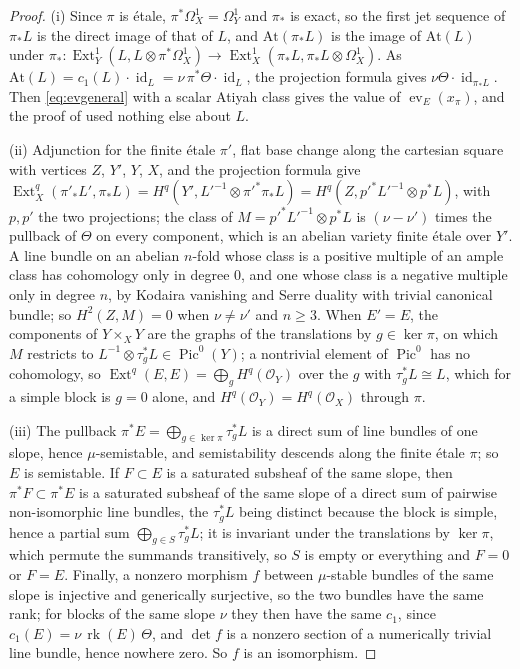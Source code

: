 \documentclass[11pt,reqno]{amsart}
\theoremstyle{plain}
\theoremstyle{definition}
\theoremstyle{remark}
\newcommand{\cO}{\mathcal{O}}
\DeclareMathOperator{\rk}{rk}
\DeclareMathOperator{\Ext}{Ext}
\DeclareMathOperator{\Pic}{Pic}
\DeclareMathOperator{\id}{id}
\begin{document}
\begin{proof}
(i) Since $\pi$ is \'etale, $\pi^{*}\Omega^{1}_{X}=\Omega^{1}_{Y}$ and $\pi_{*}$
is exact, so the first jet sequence of $\pi_{*}L$ is the direct image of
that of $L$, and $\mathrm{At}(\pi_{*}L)$ is the image of $\mathrm{At}(L)$
under $\pi_{*}\colon\Ext^{1}_{Y}(L,L\otimes\pi^{*}\Omega^{1}_{X})\to
\Ext^{1}_{X}(\pi_{*}L,\pi_{*}L\otimes\Omega^{1}_{X})$. As $\mathrm{At}(L)=c_{1}(L)\cdot\id_{L}
=\nu\,\pi^{*}\Theta\cdot\id_{L}$, the projection formula gives
$\nu\Theta\cdot\id_{\pi_{*}L}$. Then \eqref{eq:evgeneral} with a scalar Atiyah
class gives the value of $\operatorname{ev}_{E}(x_{\pi})$, and the proof of
 used nothing else about $L$.

(ii) Adjunction for the finite \'etale $\pi'$, flat base change along the
cartesian square with vertices $Z$, $Y'$, $Y$, $X$, and the projection formula
give $\Ext^{q}_{X}(\pi'_{*}L',\pi_{*}L)=H^{q}(Y',L'^{-1}\otimes\pi'^{*}\pi_{*}L)
=H^{q}(Z,p'^{*}L'^{-1}\otimes p^{*}L)$, with $p,p'$ the two projections; the
class of $M=p'^{*}L'^{-1}\otimes p^{*}L$ is $(\nu-\nu')$ times the pullback of
$\Theta$ on every component, which is an abelian variety finite \'etale over
$Y'$. A line bundle on an abelian $n$-fold whose class is a positive
multiple of an ample class has cohomology only in degree $0$, and one whose
class is a negative multiple only in degree $n$, by Kodaira vanishing and
Serre duality with trivial canonical bundle; so $H^{2}(Z,M)=0$ when
$\nu\ne\nu'$ and $n\ge3$. When $E'=E$, the components of $Y\times_{X}Y$ are
the graphs of the translations by $g\in\ker\pi$, on which $M$ restricts to
$L^{-1}\otimes\tau_{g}^{*}L\in\Pic^{0}(Y)$; a nontrivial element of $\Pic^{0}$
has no cohomology, so $\Ext^{q}(E,E)=\bigoplus_{g}H^{q}(\cO_{Y})$ over the
$g$ with $\tau_{g}^{*}L\cong L$, which for a simple block is $g=0$ alone, and
$H^{q}(\cO_{Y})=H^{q}(\cO_{X})$ through $\pi$.

(iii) The pullback $\pi^{*}E=\bigoplus_{g\in\ker\pi}\tau_{g}^{*}L$ is a direct
sum of line bundles of one slope, hence $\mu$-semistable, and semistability
descends along the finite \'etale $\pi$; so $E$ is semistable. If $F\subset E$
is a saturated subsheaf of the same slope, then $\pi^{*}F\subset\pi^{*}E$ is
a saturated subsheaf of the same slope of a direct sum of pairwise
non-isomorphic line bundles, the $\tau_{g}^{*}L$ being distinct because the
block is simple, hence a partial sum $\bigoplus_{g\in S}\tau_{g}^{*}L$; it is
invariant under the translations by $\ker\pi$, which permute the summands
transitively, so $S$ is empty or everything and $F=0$ or $F=E$. Finally, a
nonzero morphism $f$ between $\mu$-stable bundles of the same slope is
injective and generically surjective, so the two bundles have the same rank;
for blocks of the same slope $\nu$ they then have the same $c_{1}$, since
$c_{1}(E)=\nu\,\rk(E)\,\Theta$, and $\det f$ is a nonzero section of a
numerically trivial line bundle, hence nowhere zero. So $f$ is an
isomorphism.
\end{proof}
\end{document}
